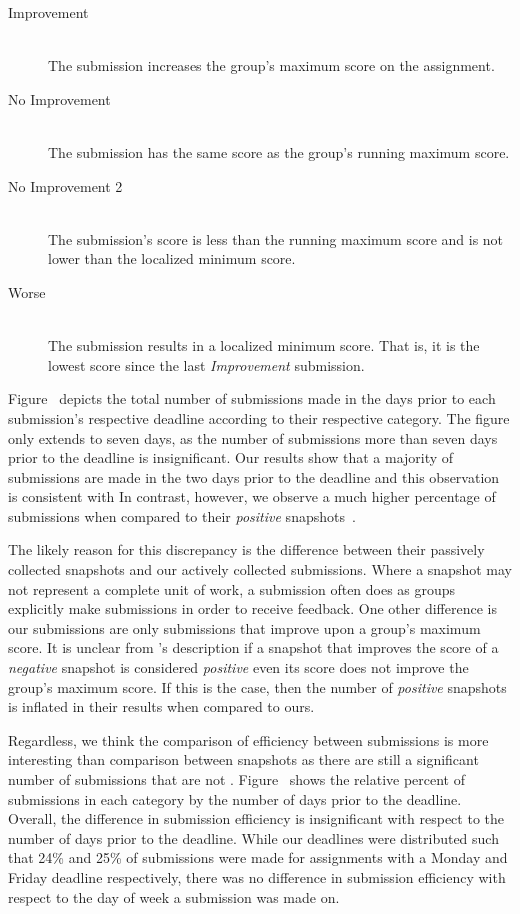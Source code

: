 \begin{description}
  \item[Improvement] \hfill \\ The submission increases the group's maximum
    score on the assignment.
  \item[No Improvement] \hfill \\ The submission has the same score as the
    group's running maximum score.
  \item[No Improvement 2] \hfill \\ The submission's score is less than the
    running maximum score and is not lower than the localized minimum score.
  \item[Worse] \hfill \\ The submission results in a localized minimum
    score. That is, it is the lowest score since the last \emph{Improvement}
    submission.
\end{description}

Figure~ depicts the total number of submissions
made in the days prior to each submission's respective deadline according to
their respective category. The figure only extends to seven days, as the number
of submissions more than seven days prior to the deadline is insignificant. Our
results show that a majority of submissions are made in the two days prior to
the deadline and this observation is consistent with \spacco{} In contrast,
however, we observe a much higher percentage of \imp{} submissions when
compared to their \emph{positive}
snapshots~\cite{Spacco:2013:TIP:2462476.2465594}.

The likely reason for this discrepancy is the difference between their
passively collected snapshots and our actively collected submissions. Where a
snapshot may not represent a complete unit of work, a submission often does as
groups explicitly make submissions in order to receive feedback. One other
difference is our \imp{} submissions are only submissions that improve upon a
group's maximum score. It is unclear from \spacco{}'s description if a snapshot
that improves the score of a \emph{negative} snapshot is considered
\emph{positive} even its score does not improve the group's maximum score. If
this is the case, then the number of \emph{positive} snapshots is inflated in
their results when compared to ours.

Regardless, we think the comparison of efficiency between submissions is more
interesting than comparison between snapshots as there are still a significant
number of submissions that are not
\imp{}. Figure~ shows the relative percent of
submissions in each category by the number of days prior to the
deadline. Overall, the difference in submission efficiency is insignificant
with respect to the number of days prior to the deadline. While our deadlines
were distributed such that 24\% and 25\% of submissions were made for
assignments with a Monday and Friday deadline respectively, there was no
difference in submission efficiency with respect to the day of week a
submission was made on.

